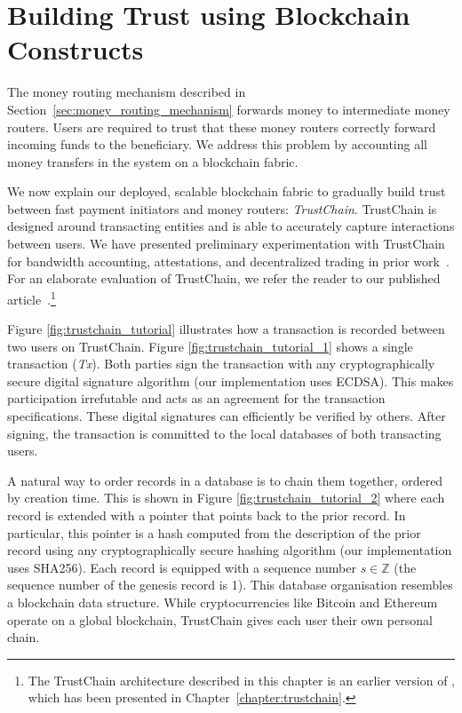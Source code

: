 \section{Building Trust using Blockchain Constructs}
\label{sec:trust}
The money routing mechanism described in Section~\ref{sec:money_routing_mechanism} forwards money to intermediate money routers.
Users are required to trust that these money routers correctly forward incoming funds to the beneficiary.
We address this problem by accounting all money transfers in the system on a blockchain fabric.

We now explain our deployed, scalable blockchain fabric to gradually build trust between fast payment initiators and money routers: \emph{TrustChain}.
TrustChain is designed around transacting entities and is able to accurately capture interactions between users.
We have presented preliminary experimentation with TrustChain for bandwidth accounting, attestations, and decentralized trading in prior work~\cite{pouwelse2017laws}. %
For an elaborate evaluation of TrustChain, we refer the reader to our published article~\cite{otte2017trustchain}.\footnote{The TrustChain architecture described in this chapter is an earlier version of \TrustChain{}, which has been presented in Chapter~\ref{chapter:trustchain}.}

Figure \ref{fig:trustchain_tutorial} illustrates how a transaction is recorded between two users on TrustChain.
Figure \ref{fig:trustchain_tutorial_1} shows a single transaction (\emph{Tx}).
Both parties sign the transaction with any cryptographically secure digital signature algorithm (our implementation uses ECDSA).
This makes participation irrefutable and acts as an agreement for the transaction specifications.
These digital signatures can efficiently be verified by others.
After signing, the transaction is committed to the local databases of both transacting users.

A natural way to order records in a database is to chain them together, ordered by creation time.
This is shown in Figure \ref{fig:trustchain_tutorial_2} where each record is extended with a pointer that points back to the prior record.
In particular, this pointer is a hash computed from the description of the prior record using any cryptographically secure hashing algorithm (our implementation uses SHA256).
Each record is equipped with a sequence number $ s \in \mathbb{Z} $ (the sequence number of the genesis record is 1).
This database organisation resembles a blockchain data structure.
While cryptocurrencies like Bitcoin and Ethereum operate on a global blockchain, TrustChain gives each user their own personal chain.

